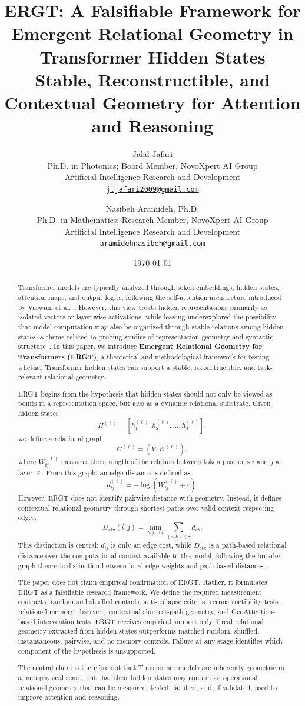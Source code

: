 \documentclass[11pt]{article}
\title{\textbf{ERGT: A Falsifiable Framework for Emergent Relational Geometry in Transformer Hidden States}\\[0.5em]
\large Stable, Reconstructible, and Contextual Geometry for Attention and Reasoning}
\author{
Jalal Jafari\\
\small Ph.D. in Photonics; Board Member, NovoXpert AI Group\\
\small Artificial Intelligence Research and Development\\
\small \href{mailto:j.jafari2009@gmail.com}{\texttt{j.jafari2009@gmail.com}}
\and
Nasibeh Aramideh, Ph.D.\\
\small Ph.D. in Mathematics; Research Member, NovoXpert AI Group\\
\small Artificial Intelligence Research and Development\\
\small \href{mailto:aramidehnasibeh@gmail.com}{\texttt{aramidehnasibeh@gmail.com}}
}
\date{\today}
\begin{document}
\sloppy

\maketitle

\begin{abstract}
Transformer models are typically analyzed through token embeddings, hidden states, attention maps, and output logits, following the self-attention architecture introduced by Vaswani et al.~\cite{vaswani2017attention}. However, this view treats hidden representations primarily as isolated vectors or layer-wise activations, while leaving underexplored the possibility that model computation may also be organized through stable relations among hidden states, a theme related to probing studies of representation geometry and syntactic structure~\cite{hewitt2019structural,belinkov2019analysis}. In this paper, we introduce \textbf{Emergent Relational Geometry for Transformers (ERGT)}, a theoretical and methodological framework for testing whether Transformer hidden states can support a stable, reconstructible, and task-relevant relational geometry.

ERGT begins from the hypothesis that hidden states should not only be viewed as points in a representation space, but also as a dynamic relational substrate. Given hidden states
\[
H^{(\ell)}=[h_1^{(\ell)},h_2^{(\ell)},\ldots,h_T^{(\ell)}],
\]
we define a relational graph
\[
G^{(\ell)}=(V,W^{(\ell)}),
\]
where $W_{ij}^{(\ell)}$ measures the strength of the relation between token positions $i$ and $j$ at layer $\ell$. From this graph, an edge distance is defined as
\[
d_{ij}^{(\ell)}=-\log(W_{ij}^{(\ell)}+\varepsilon).
\]
However, ERGT does not identify pairwise distance with geometry. Instead, it defines contextual relational geometry through shortest paths over valid context-respecting edges:
\[
D_{\mathrm{ctx}}(i,j)
=
\min_{\gamma:j\to i}
\sum_{(a,b)\in\gamma}d_{ab}.
\]
This distinction is central: $d_{ij}$ is only an edge cost, while $D_{\mathrm{ctx}}$ is a path-based relational distance over the computational context available to the model, following the broader graph-theoretic distinction between local edge weights and path-based distances~\cite{dijkstra1959note,chung1997spectral}.

The paper does not claim empirical confirmation of ERGT. Rather, it formulates ERGT as a falsifiable research framework. We define the required measurement contracts, random and shuffled controls, anti-collapse criteria, reconstructibility tests, relational memory observers, contextual shortest-path geometry, and GeoAttention-based intervention tests. ERGT receives empirical support only if real relational geometry extracted from hidden states outperforms matched random, shuffled, instantaneous, pairwise, and no-memory controls. Failure at any stage identifies which component of the hypothesis is unsupported.

The central claim is therefore not that Transformer models are inherently geometric in a metaphysical sense, but that their hidden states may contain an operational relational geometry that can be measured, tested, falsified, and, if validated, used to improve attention and reasoning.
\end{abstract}
\end{document}
